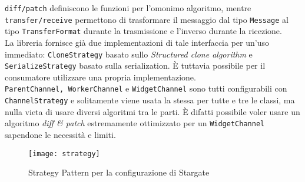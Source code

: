 \texttt{diff/patch} definiscono le funzioni per l'omonimo algoritmo, mentre \texttt{transfer/receive} permettono di trasformare il messaggio dal tipo \texttt{Message} al tipo \texttt{TransferFormat} durante la trasmissione e l'inverso durante la ricezione. \\

La libreria fornisce già due implementazioni di tale interfaccia per un'uso immediato: \texttt{CloneStrategy} basato sullo \textit{Structured clone algorithm} e \texttt{SerializeStrategy} basato sulla serialization. È tuttavia possibile per il consumatore utilizzare una propria implementazione. \\

\texttt{ParentChannel, WorkerChannel} e \texttt{WidgetChannel} sono tutti configurabili con \texttt{ChannelStrategy} e solitamente viene usata la stessa per tutte e tre le classi, ma nulla vieta di usare diversi algoritmi tra le parti. È difatti possibile voler usare un algoritmo \textit{diff \& patch} estremamente ottimizzato per un \texttt{WidgetChannel} sapendone le necessità e limiti.

\begin{figure}[H] 
  \centering 
  \texttt{[image: strategy]} 
  \caption{Strategy Pattern per la configurazione di Stargate}
\end{figure}
